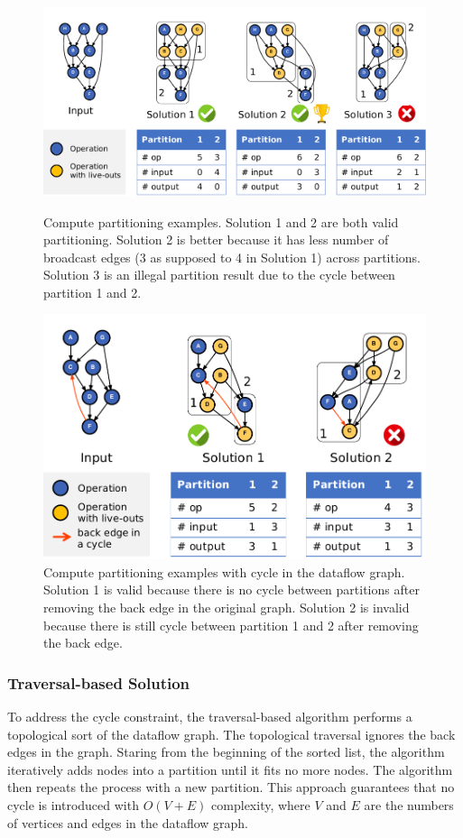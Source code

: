 \begin{figure}
  \centering
  \includegraphics[width=1\columnwidth]{figs/parteg.pdf}
  \caption[Compute partitioning examples]{
    Compute partitioning examples. Solution 1 and 2 are both valid partitioning. Solution 2 is
    better because it has less number of broadcast edges (3 as supposed to 4 in Solution 1) across partitions. 
    Solution 3 is an illegal partition result due to the cycle between partition 1 and 2.
  }
  \label{fig:parteg}

  \includegraphics[width=0.8\columnwidth]{figs/partcycleeg.pdf}
  \caption[Compute partitioning examples with cycle]{
    Compute partitioning examples with cycle in the dataflow graph.
    Solution 1 is valid because there is no 
    cycle between partitions after removing the back edge in
    the original graph.
    Solution 2 is invalid because there is still cycle between partition 1 and 2 after
    removing the back edge.
  }
  \label{fig:partcycleeg}
\end{figure}

\subsubsection{Traversal-based Solution}
To address the cycle constraint, the traversal-based algorithm performs a topological sort of the dataflow graph.
The topological traversal ignores the back edges in the graph. 
Staring from the beginning of the sorted list, the algorithm iteratively adds nodes into a partition
until it fits no more nodes. The algorithm then repeats the process with a new partition.
This approach guarantees that no cycle is introduced with $O(V+E)$ complexity, 
where $V$ and $E$ are the numbers of vertices and edges in the dataflow graph.

